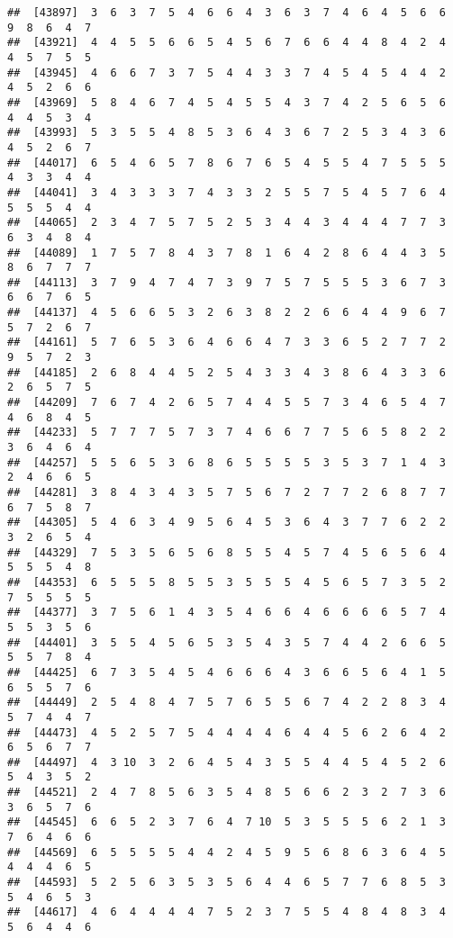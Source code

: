\documentclass[
]{book}
\begin{document}
\begin{verbatim}
##  [43897]  3  6  3  7  5  4  6  6  4  3  6  3  7  4  6  4  5  6  6  9  8  6  4  7
##  [43921]  4  4  5  5  6  6  5  4  5  6  7  6  6  4  4  8  4  2  4  4  5  7  5  5
##  [43945]  4  6  6  7  3  7  5  4  4  3  3  7  4  5  4  5  4  4  2  4  5  2  6  6
##  [43969]  5  8  4  6  7  4  5  4  5  5  4  3  7  4  2  5  6  5  6  4  4  5  3  4
##  [43993]  5  3  5  5  4  8  5  3  6  4  3  6  7  2  5  3  4  3  6  4  5  2  6  7
##  [44017]  6  5  4  6  5  7  8  6  7  6  5  4  5  5  4  7  5  5  5  4  3  3  4  4
##  [44041]  3  4  3  3  3  7  4  3  3  2  5  5  7  5  4  5  7  6  4  5  5  5  4  4
##  [44065]  2  3  4  7  5  7  5  2  5  3  4  4  3  4  4  4  7  7  3  6  3  4  8  4
##  [44089]  1  7  5  7  8  4  3  7  8  1  6  4  2  8  6  4  4  3  5  8  6  7  7  7
##  [44113]  3  7  9  4  7  4  7  3  9  7  5  7  5  5  5  3  6  7  3  6  6  7  6  5
##  [44137]  4  5  6  6  5  3  2  6  3  8  2  2  6  6  4  4  9  6  7  5  7  2  6  7
##  [44161]  5  7  6  5  3  6  4  6  6  4  7  3  3  6  5  2  7  7  2  9  5  7  2  3
##  [44185]  2  6  8  4  4  5  2  5  4  3  3  4  3  8  6  4  3  3  6  2  6  5  7  5
##  [44209]  7  6  7  4  2  6  5  7  4  4  5  5  7  3  4  6  5  4  7  4  6  8  4  5
##  [44233]  5  7  7  7  5  7  3  7  4  6  6  7  7  5  6  5  8  2  2  3  6  4  6  4
##  [44257]  5  5  6  5  3  6  8  6  5  5  5  5  3  5  3  7  1  4  3  2  4  6  6  5
##  [44281]  3  8  4  3  4  3  5  7  5  6  7  2  7  7  2  6  8  7  7  6  7  5  8  7
##  [44305]  5  4  6  3  4  9  5  6  4  5  3  6  4  3  7  7  6  2  2  3  2  6  5  4
##  [44329]  7  5  3  5  6  5  6  8  5  5  4  5  7  4  5  6  5  6  4  5  5  5  4  8
##  [44353]  6  5  5  5  8  5  5  3  5  5  5  4  5  6  5  7  3  5  2  7  5  5  5  5
##  [44377]  3  7  5  6  1  4  3  5  4  6  6  4  6  6  6  6  5  7  4  5  5  3  5  6
##  [44401]  3  5  5  4  5  6  5  3  5  4  3  5  7  4  4  2  6  6  5  5  5  7  8  4
##  [44425]  6  7  3  5  4  5  4  6  6  6  4  3  6  6  5  6  4  1  5  6  5  5  7  6
##  [44449]  2  5  4  8  4  7  5  7  6  5  5  6  7  4  2  2  8  3  4  5  7  4  4  7
##  [44473]  4  5  2  5  7  5  4  4  4  4  6  4  4  5  6  2  6  4  2  6  5  6  7  7
##  [44497]  4  3 10  3  2  6  4  5  4  3  5  5  4  4  5  4  5  2  6  5  4  3  5  2
##  [44521]  2  4  7  8  5  6  3  5  4  8  5  6  6  2  3  2  7  3  6  3  6  5  7  6
##  [44545]  6  6  5  2  3  7  6  4  7 10  5  3  5  5  5  6  2  1  3  7  6  4  6  6
##  [44569]  6  5  5  5  5  4  4  2  4  5  9  5  6  8  6  3  6  4  5  4  4  4  6  5
##  [44593]  5  2  5  6  3  5  3  5  6  4  4  6  5  7  7  6  8  5  3  5  4  6  5  3
##  [44617]  4  6  4  4  4  4  7  5  2  3  7  5  5  4  8  4  8  3  4  5  6  4  4  6

\end{verbatim}
\end{document}
